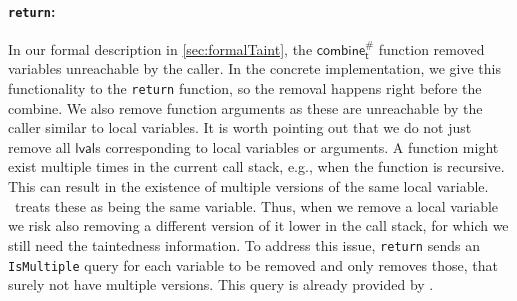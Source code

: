           \paragraph{\texttt{return}:} In our formal description in \autoref{sec:formalTaint}, the $\textsf{combine}^{\#}_\textsf{t}$ function removed variables unreachable by the caller. In the concrete implementation, we give this functionality to the \texttt{return} function, so the removal happens right before the combine. We also remove function arguments as these are unreachable by the caller similar to local variables.
          It is worth pointing out that we do not just remove all $\textsf{lval}$s corresponding to local variables or arguments. A function might exist multiple times in the current call stack, e.g., when the function is recursive. This can result in the existence of multiple versions of the same local variable. \gob\ treats these as being the same variable. Thus, when we remove a local variable we risk also removing a different version of it lower in the call stack, for which we still need the taintedness information. To address this issue, \texttt{return} sends an \texttt{IsMultiple} query for each variable to be removed and only removes those, that surely not have multiple versions. This query is already provided by \gob.

